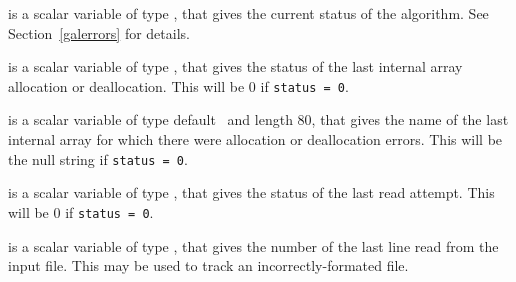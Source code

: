 \documentclass{galahad}
\begin{document}
\begin{description}
 is a scalar variable of type \integer, that gives the
current status of the algorithm. See Section~\ref{galerrors} for details.

 is a scalar variable of type \integer,
that gives the status of the last internal array allocation
or deallocation. This will be 0 if {\tt status = 0}.

 is a scalar variable of type default \character\
and length 80, that  gives the name of the last internal array
for which there were allocation or deallocation errors.
This will be the null string if {\tt status = 0}.

 is a scalar variable of type \integer,
that gives the status of the last read attempt.
This will be 0 if {\tt status = 0}.

 is a scalar variable of type \integer,
that gives the number of the last line read from the input file.
This may be used to track an incorrectly-formated file.


\end{description}
\end{document}
